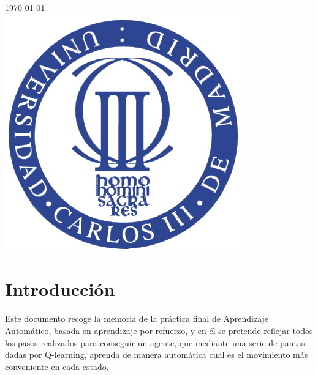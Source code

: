 \documentclass[11pt,a4paper]{article}
\begin{document}
\begin{titlepage}
{\large \today}\\[2cm] %


\includegraphics[scale=1]{images/logo.jpg} \\[1cm] %
 

\vfill %

\end{titlepage}

\tableofcontents
\newpage

\section{Introducción}
Este documento recoge la memoria de la práctica final de Aprendizaje Automático, basada en aprendizaje por refuerzo, y en él se pretende reflejar todos los pasos realizados para conseguir un agente, que mediante una serie de pautas dadas por Q-learning, aprenda de manera automática cual es el movimiento más conveniente en cada estado.
\end{document}
